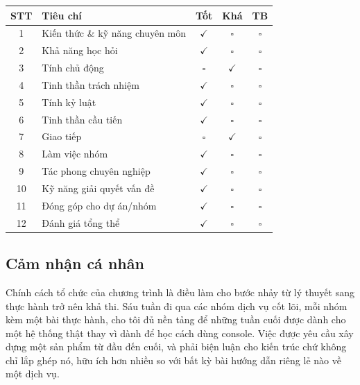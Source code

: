 \begin{center}
\renewcommand{\arraystretch}{1.25}
\begin{tabular}{@{}c>{\raggedright\arraybackslash}p{7.2cm}ccc@{}}
\toprule
\textbf{STT} & \textbf{Tiêu chí} & \textbf{Tốt} & \textbf{Khá} & \textbf{TB} \\
\midrule
1  & Kiến thức \& kỹ năng chuyên môn & $\checkmark$ & $\square$ & $\square$ \\
2  & Khả năng học hỏi                & $\checkmark$ & $\square$ & $\square$ \\
3  & Tính chủ động                   & $\square$ & $\checkmark$ & $\square$ \\
4  & Tinh thần trách nhiệm           & $\checkmark$ & $\square$ & $\square$ \\
5  & Tính kỷ luật                    & $\checkmark$ & $\square$ & $\square$ \\
6  & Tinh thần cầu tiến              & $\checkmark$ & $\square$ & $\square$ \\
7  & Giao tiếp                       & $\square$ & $\checkmark$ & $\square$ \\
8  & Làm việc nhóm                   & $\checkmark$ & $\square$ & $\square$ \\
9  & Tác phong chuyên nghiệp         & $\checkmark$ & $\square$ & $\square$ \\
10 & Kỹ năng giải quyết vấn đề       & $\checkmark$ & $\square$ & $\square$ \\
11 & Đóng góp cho dự án/nhóm         & $\checkmark$ & $\square$ & $\square$ \\
12 & Đánh giá tổng thể               & $\checkmark$ & $\square$ & $\square$ \\
\bottomrule
\end{tabular}
\end{center}

\subsection{Cảm nhận cá nhân}

Chính cách tổ chức của chương trình là điều làm cho bước nhảy từ lý thuyết sang
thực hành trở nên khả thi. Sáu tuần đi qua các nhóm dịch vụ cốt lõi, mỗi nhóm
kèm một bài thực hành, cho tôi đủ nền tảng để những tuần cuối được dành cho một
hệ thống thật thay vì dành để học cách dùng console. Việc được yêu cầu xây dựng
một sản phẩm từ đầu đến cuối, và phải biện luận cho kiến trúc chứ không chỉ lắp
ghép nó, hữu ích hơn nhiều so với bất kỳ bài hướng dẫn riêng lẻ nào về một dịch
vụ.

